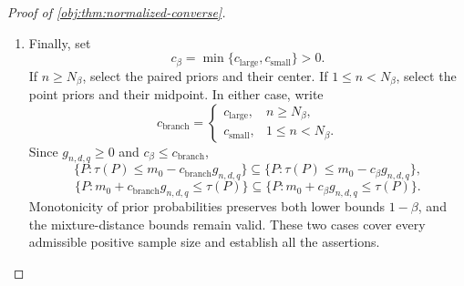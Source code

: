 \documentclass[11pt]{article}
\begin{document}
\begin{proof}[Proof of \cref{obj:thm:normalized-converse}]
\begin{enumerate}
\item
Finally, set
\[
c_\beta=\min\{c_{\mathrm{large}},c_{\mathrm{small}}\}>0.
\]
If \(n\ge N_\beta\), select the paired priors and their center. If
\(1\le n<N_\beta\), select the point priors and their midpoint.
In either case, write
\[
c_{\mathrm{branch}}
=
\begin{cases}
c_{\mathrm{large}},&n\ge N_\beta,\\
c_{\mathrm{small}},&1\le n<N_\beta.
\end{cases}
\]
Since \(g_{n,d,q}\ge0\) and \(c_\beta\le c_{\mathrm{branch}}\),
\[
\{P:\tau(P)\le m_0-c_{\mathrm{branch}}g_{n,d,q}\}
\subseteq
\{P:\tau(P)\le m_0-c_\beta g_{n,d,q}\},
\]
\[
\{P:m_0+c_{\mathrm{branch}}g_{n,d,q}\le\tau(P)\}
\subseteq
\{P:m_0+c_\beta g_{n,d,q}\le\tau(P)\}.
\]
Monotonicity of prior probabilities preserves both lower bounds
\(1-\beta\), and the mixture-distance bounds remain valid. These two cases cover every admissible positive sample size and establish all the assertions.
\end{enumerate}
\end{proof}




\end{document}
